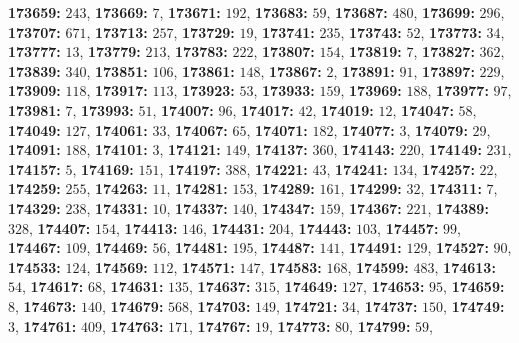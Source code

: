 \textsf{\bfseries 173659:} $243$, \textsf{\bfseries 173669:} $7$, \textsf{\bfseries 173671:} $192$, \textsf{\bfseries 173683:} $59$, \textsf{\bfseries 173687:} $480$, \textsf{\bfseries 173699:} $296$, \textsf{\bfseries 173707:} $671$, \textsf{\bfseries 173713:} $257$, \textsf{\bfseries 173729:} $19$, \textsf{\bfseries 173741:} $235$, \textsf{\bfseries 173743:} $52$, \textsf{\bfseries 173773:} $34$, \textsf{\bfseries 173777:} $13$, \textsf{\bfseries 173779:} $213$, \textsf{\bfseries 173783:} $222$, \textsf{\bfseries 173807:} $154$, \textsf{\bfseries 173819:} $7$, \textsf{\bfseries 173827:} $362$, \textsf{\bfseries 173839:} $340$, \textsf{\bfseries 173851:} $106$, \textsf{\bfseries 173861:} $148$, \textsf{\bfseries 173867:} $2$, \textsf{\bfseries 173891:} $91$, \textsf{\bfseries 173897:} $229$, \textsf{\bfseries 173909:} $118$, \textsf{\bfseries 173917:} $113$, \textsf{\bfseries 173923:} $53$, \textsf{\bfseries 173933:} $159$, \textsf{\bfseries 173969:} $188$, \textsf{\bfseries 173977:} $97$, \textsf{\bfseries 173981:} $7$, \textsf{\bfseries 173993:} $51$, \textsf{\bfseries 174007:} $96$, \textsf{\bfseries 174017:} $42$, \textsf{\bfseries 174019:} $12$, \textsf{\bfseries 174047:} $58$, \textsf{\bfseries 174049:} $127$, \textsf{\bfseries 174061:} $33$, \textsf{\bfseries 174067:} $65$, \textsf{\bfseries 174071:} $182$, \textsf{\bfseries 174077:} $3$, \textsf{\bfseries 174079:} $29$, \textsf{\bfseries 174091:} $188$, \textsf{\bfseries 174101:} $3$, \textsf{\bfseries 174121:} $149$, \textsf{\bfseries 174137:} $360$, \textsf{\bfseries 174143:} $220$, \textsf{\bfseries 174149:} $231$, \textsf{\bfseries 174157:} $5$, \textsf{\bfseries 174169:} $151$, \textsf{\bfseries 174197:} $388$, \textsf{\bfseries 174221:} $43$, \textsf{\bfseries 174241:} $134$, \textsf{\bfseries 174257:} $22$, \textsf{\bfseries 174259:} $255$, \textsf{\bfseries 174263:} $11$, \textsf{\bfseries 174281:} $153$, \textsf{\bfseries 174289:} $161$, \textsf{\bfseries 174299:} $32$, \textsf{\bfseries 174311:} $7$, \textsf{\bfseries 174329:} $238$, \textsf{\bfseries 174331:} $10$, \textsf{\bfseries 174337:} $140$, \textsf{\bfseries 174347:} $159$, \textsf{\bfseries 174367:} $221$, \textsf{\bfseries 174389:} $328$, \textsf{\bfseries 174407:} $154$, \textsf{\bfseries 174413:} $146$, \textsf{\bfseries 174431:} $204$, \textsf{\bfseries 174443:} $103$, \textsf{\bfseries 174457:} $99$, \textsf{\bfseries 174467:} $109$, \textsf{\bfseries 174469:} $56$, \textsf{\bfseries 174481:} $195$, \textsf{\bfseries 174487:} $141$, \textsf{\bfseries 174491:} $129$, \textsf{\bfseries 174527:} $90$, \textsf{\bfseries 174533:} $124$, \textsf{\bfseries 174569:} $112$, \textsf{\bfseries 174571:} $147$, \textsf{\bfseries 174583:} $168$, \textsf{\bfseries 174599:} $483$, \textsf{\bfseries 174613:} $54$, \textsf{\bfseries 174617:} $68$, \textsf{\bfseries 174631:} $135$, \textsf{\bfseries 174637:} $315$, \textsf{\bfseries 174649:} $127$, \textsf{\bfseries 174653:} $95$, \textsf{\bfseries 174659:} $8$, \textsf{\bfseries 174673:} $140$, \textsf{\bfseries 174679:} $568$, \textsf{\bfseries 174703:} $149$, \textsf{\bfseries 174721:} $34$, \textsf{\bfseries 174737:} $150$, \textsf{\bfseries 174749:} $3$, \textsf{\bfseries 174761:} $409$, \textsf{\bfseries 174763:} $171$, \textsf{\bfseries 174767:} $19$, \textsf{\bfseries 174773:} $80$, \textsf{\bfseries 174799:} $59$, 
